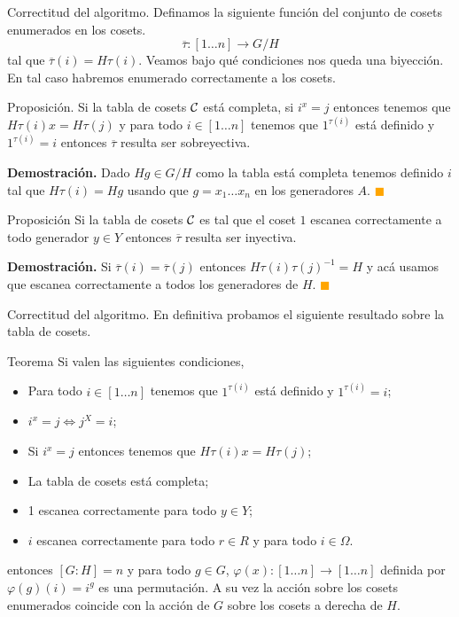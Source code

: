 \documentclass[aspectratio=169, 9pt]{beamer}
\renewcommand\qedsymbol{\textcolor{orange}{$\blacksquare$}}
\newcommand{\In}{[1 \dots n]}
\newcommand{\ol}{\overline}
\newcommand{\Co}{{\cal{C}}}
\begin{document}
\begin{frame}[fragile]{Correctitud del algoritmo.}
	Definamos la siguiente función del conjunto de cosets enumerados en los cosets.
	\[
	\ol \tau: \In \to G/H
	\]
	tal que $\ol \tau (i) = H \tau (i)$.
	\pause
	Veamos bajo qué condiciones nos queda una biyección. 
	En tal caso habremos enumerado correctamente a los cosets.
	\medskip
	\pause
	\begin{alertblock}{Proposición.}
		Si la tabla de cosets $\Co$ está completa, si $i^x = j$ entonces tenemos que $H \tau(i) x = H \tau(j)$ y para todo $i \in \In$ tenemos que $1^{\tau(i)}$ está definido y $1^{\tau(i)} = i$ entonces $\ol \tau$ resulta ser sobreyectiva.
	\end{alertblock}
	\pause
	
	\textbf{Demostración.}
	Dado $Hg \in G/H$ como la tabla está completa tenemos definido $i$ tal que $H\tau(i) = Hg$ usando que $g = x_1 \dots x_n$ en los generadores $A$. \qedsymbol
	
	\pause
	\begin{alertblock}{Proposición}
		Si la tabla de cosets $\Co$ es tal que el coset $1$ escanea correctamente a todo generador $y \in Y$ entonces $\ol \tau$ resulta ser inyectiva.
	\end{alertblock}
	\pause
	\textbf{Demostración.}
	Si $\ol \tau (i) = \ol \tau (j)$ entonces $H \tau (i) \tau (j)^{-1} = H$ \pause y acá usamos que escanea correctamente a todos los generadores de $H$. \qedsymbol
\end{frame}


\begin{frame}[fragile]{Correctitud del algoritmo.}
	En definitiva probamos el siguiente resultado sobre la tabla de cosets.
	\pause
	\begin{alertblock}{Teorema}
		Si valen las siguientes condiciones,
		\begin{itemize}
			\item Para todo $i \in \In$ tenemos que $1^{\tau(i)}$ está definido y $1^{\tau(i)} = i$;
			\item $i^x = j \iff j^{X} = i$;
			\item Si $i^x = j$ entonces tenemos que $H \tau(i) x = H \tau(j)$;
			\item La tabla de cosets está completa;
			\item 1 escanea correctamente para todo $y \in Y$;
			\item $i$ escanea correctamente para todo $r \in R$ y para todo $i \in \Omega$.
		\end{itemize}
		\pause
		entonces $[G:H] = n$ y para todo $g \in G$, $\varphi(x): \In \to \In$ definida por $\varphi(g)(i) = i^g$ es una permutación.
		A su vez la acción sobre los cosets enumerados coincide con la acción de $G$ sobre los cosets a derecha de $H$.
	\end{alertblock}
	\pause
	\medskip
\end{frame}
\end{document}
